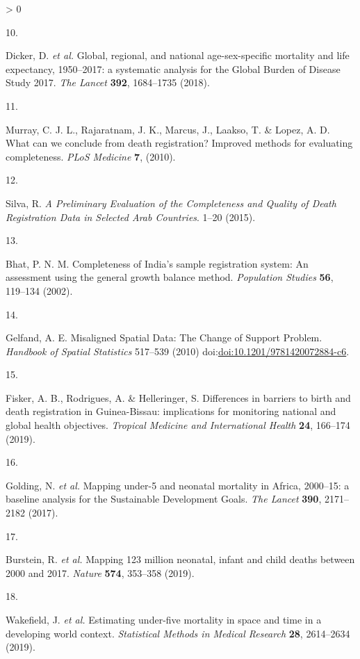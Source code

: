 \documentclass[
]{article}
\newlength{\cslhangindent}
\newlength{\csllabelwidth}
\newenvironment{CSLReferences}[2] %
 {%
  \setlength{\parindent}{0pt}
  \ifodd #1 \everypar{\setlength{\hangindent}{\cslhangindent}}\ignorespaces\fi
  \ifnum #2 > 0
  \setlength{\parskip}{#2\baselineskip}
  \fi
 }%
 {}
\newcommand{\CSLLeftMargin}[1]{\parbox[t]{\csllabelwidth}{#1}}
\newcommand{\CSLRightInline}[1]{\parbox[t]{\linewidth - \csllabelwidth}{#1}\break}
\begin{document}
\begin{CSLReferences}{0}{0}
\leavevmode\hypertarget{ref-Dicker2018}{}%
\CSLLeftMargin{10. }
\CSLRightInline{Dicker, D. \emph{et al.} {Global, regional, and national age-sex-specific mortality and life expectancy, 1950--2017: a systematic analysis for the Global Burden of Disease Study 2017}. \emph{The Lancet} \textbf{392}, 1684--1735 (2018).}

\leavevmode\hypertarget{ref-Murray2010}{}%
\CSLLeftMargin{11. }
\CSLRightInline{Murray, C. J. L., Rajaratnam, J. K., Marcus, J., Laakso, T. \& Lopez, A. D. {What can we conclude from death registration? Improved methods for evaluating completeness}. \emph{PLoS Medicine} \textbf{7}, (2010).}

\leavevmode\hypertarget{ref-Silva2015}{}%
\CSLLeftMargin{12. }
\CSLRightInline{Silva, R. \emph{{A Preliminary Evaluation of the Completeness and Quality of Death Registration Data in Selected Arab Countries}}. 1--20 (2015).}

\leavevmode\hypertarget{ref-Bhat2002}{}%
\CSLLeftMargin{13. }
\CSLRightInline{Bhat, P. N. M. {Completeness of India's sample registration system: An assessment using the general growth balance method}. \emph{Population Studies} \textbf{56}, 119--134 (2002).}

\leavevmode\hypertarget{ref-Gelfand2010}{}%
\CSLLeftMargin{14. }
\CSLRightInline{Gelfand, A. E. {Misaligned Spatial Data: The Change of Support Problem}. \emph{Handbook of Spatial Statistics} 517--539 (2010) doi:\href{https://doi.org/doi:10.1201/9781420072884-c6}{doi:10.1201/9781420072884-c6}.}

\leavevmode\hypertarget{ref-Fisker2019}{}%
\CSLLeftMargin{15. }
\CSLRightInline{Fisker, A. B., Rodrigues, A. \& Helleringer, S. {Differences in barriers to birth and death registration in Guinea-Bissau: implications for monitoring national and global health objectives}. \emph{Tropical Medicine and International Health} \textbf{24}, 166--174 (2019).}

\leavevmode\hypertarget{ref-Golding2017}{}%
\CSLLeftMargin{16. }
\CSLRightInline{Golding, N. \emph{et al.} {Mapping under-5 and neonatal mortality in Africa, 2000--15: a baseline analysis for the Sustainable Development Goals}. \emph{The Lancet} \textbf{390}, 2171--2182 (2017).}

\leavevmode\hypertarget{ref-Burstein2019}{}%
\CSLLeftMargin{17. }
\CSLRightInline{Burstein, R. \emph{et al.} {Mapping 123 million neonatal, infant and child deaths between 2000 and 2017}. \emph{Nature} \textbf{574}, 353--358 (2019).}

\leavevmode\hypertarget{ref-Wakefield2019}{}%
\CSLLeftMargin{18. }
\CSLRightInline{Wakefield, J. \emph{et al.} {Estimating under-five mortality in space and time in a developing world context}. \emph{Statistical Methods in Medical Research} \textbf{28}, 2614--2634 (2019).}


\end{CSLReferences}
\end{document}
